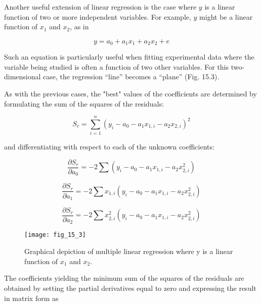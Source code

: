 \documentclass[../main.tex]{subfiles}
\begin{document}
\noindent Another useful extension of linear regression is the case where $y$ is a linear function of two or more independent variables. For example, $y$ might be a linear function of $x_1$ and $x_2$, as in

\begin{equation}
	y = a_0 + a_1x_1 + a_2x_2+e
\end{equation}

\noindent Such an equation is particularly useful when fitting experimental data where the variable being studied is often a function of two other variables. For this two-dimensional case, the regression ``line'' becomes a ``plane'' (Fig. 15.3).

As with the previous cases, the "best" values of the coefficients are determined by formulating the sum of the squares of the residuals:

\begin{equation}
	\tag{15.4}
	S_r = \sum_{i=1}^n (y_i - a_0 - a_1x_{1,i} - a_2x_{2,i})^2
\end{equation}

\noindent and differentiating with respect to each of the unknown coefficients:

\begin{equation}
	\frac{\partial S_r}{\partial a_0} = -2 \sum (y_i -a_0 -a_1x_{1,i} - a_2x_{2,i}^2)
\end{equation}

\begin{equation}
	\frac{\partial S_r}{\partial a_1} = -2 \sum x_{1,i} (y_i -a_0 -a_1x_{1,i} - a_2x_{2,i}^2)
\end{equation}

\begin{equation}
	\frac{\partial S_r}{\partial a_2} = -2 \sum x_{2,i}^2 (y_i -a_0 -a_1x_{1,i} - a_2x_{2,i}^2)
\end{equation}

\begin{wrapfigure}{l}{0.25\textwidth}
    \centering
    \texttt{[image: fig\_15\_3]}
   \caption{\textsf{Graphical depiction of multiple linear regression where y is a linear function of $x_1$ and $x_2$.}}
   \label{fig:fig_15_3}
\end{wrapfigure}

\noindent The coefficients yielding the minimum sum of the squares of the residuals are obtained by setting the partial derivatives equal to zero and expressing the result in matrix form as 
\end{document}
